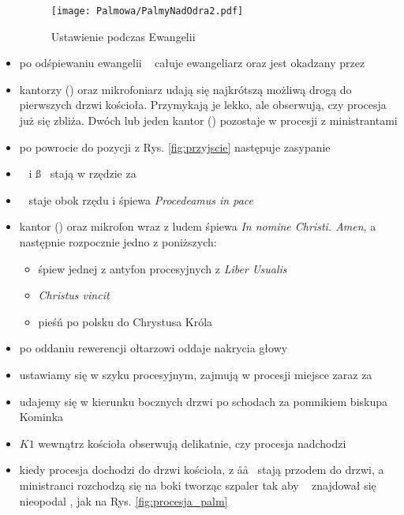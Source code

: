\begin{itemize}
	      \begin{figure}[h!]
		      \centering
		      \texttt{[image: Palmowa/PalmyNadOdra2.pdf]}
		      \caption{Ustawienie podczas Ewangelii}
		      \label{fig:ewangelia}
	      \end{figure}

	\item po odśpiewaniu ewangelii \ii~ całuje ewangeliarz oraz jest okadzany
	      przez \dd
	\item kantorzy () oraz mikrofoniarz udają się najkrótszą możliwą drogą
	      do pierwszych drzwi kościoła. Przymykają je lekko, ale obserwują, czy
	      procesja już się zbliża. Dwóch lub jeden kantor () pozostaje w
	      procesji z ministrantami
	\item po powrocie do pozycji z Rys. \ref{fig:przyjscie} następuje zasypanie
	\item \dd~ i \ss~ stają w rzędzie za \ii
	\item \dd~ staje obok rzędu i śpiewa \textit{Procedeamus in pace}
	\item kantor () oraz mikrofon wraz z ludem śpiewa \textit{In nomine
		      Christi. Amen}, a następnie rozpocznie jedno z poniższych:

	      \begin{itemize}
		      \item śpiew jednej z antyfon procesyjnych z \textit{Liber
			            Usualis}
		      \item \textit{Christus vincit}
		      \item pieśń po polsku do Chrystusa Króla
	      \end{itemize}

	\item po oddaniu rewerencji ołtarzowi  oddaje nakrycia głowy
	\item ustawiamy się w szyku procesyjnym,  zajmują w procesji miejsce
	      zaraz za 
	\item udajemy się w kierunku bocznych drzwi po schodach za pomnikiem biskupa
	      Kominka
	\item $K1$ wewnątrz kościoła obserwują delikatnie, czy procesja nadchodzi
	\item kiedy procesja dochodzi do drzwi kościoła,  z \aa\aa~ stają przodem
	      do drzwi, a ministranci rozchodzą się na boki tworząc szpaler tak aby
	      \ii~ znajdował się nieopodal , jak na Rys. \ref{fig:procesja_palm}

	      \medskip


\end{itemize}
